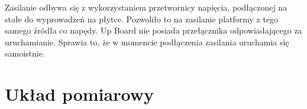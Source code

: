 Zasilanie odbywa się z wykorzystaniem przetwornicy napięcia, podłączonej na stałe do wyprowadzeń na płytce. Pozwoliło to na zasilanie platformy z tego samego źródła co napędy. Up Board nie posiada przełącznika odpowiadającego za uruchamianie. Sprawia to, że w momencie podłączenia zasilania uruchamia się samoistnie.
\begin{table}[h]
	\centering
	\caption{Specyfikacja minikomputera Up Board.}
	\label{up_board_specyfikacja}
\end{table}

\section{Układ pomiarowy}

